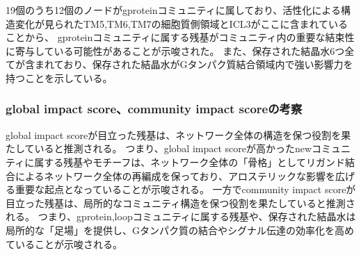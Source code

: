 \newpage

19個のうち12個のノードがgproteinコミュニティに属しており、活性化による構造変化が見られたTM5,TM6,TM7の細胞質側領域とICL3がここに含まれていることから、
gproteinコミュニティに属する残基がコミュニティ内の重要な結束性に寄与している可能性があることが示唆された。
また、保存された結晶水6つ全てが含まれており、保存された結晶水がGタンパク質結合領域内で強い影響力を持つことを示している。


\subsubsection{global impact score、community impact scoreの考察}

global impact scoreが目立った残基は、ネットワーク全体の構造を保つ役割を果たしていると推測される。
つまり、global impact scoreが高かったnewコミュニティに属する残基やモチーフは、ネットワーク全体の「骨格」としてリガンド結合によるネットワーク全体の再編成を保っており、アロステリックな影響を広げる重要な起点となっていることが示唆される。
一方でcommunity impact scoreが目立った残基は、局所的なコミュニティ構造を保つ役割を果たしていると推測される。
つまり、gprotein,loopコミュニティに属する残基や、保存された結晶水は局所的な「足場」を提供し、Gタンパク質の結合やシグナル伝達の効率化を高めていることが示唆される。





